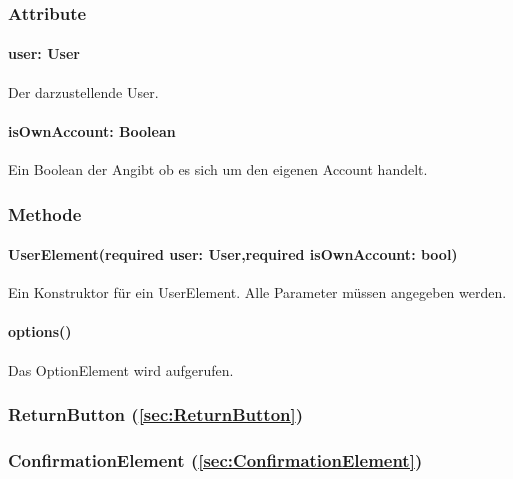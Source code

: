\documentclass[parskip=full]{scrartcl}
\begin{document}
        \subsubsection*{Attribute}

            \paragraph*{user: User} Der darzustellende User.
            \paragraph*{isOwnAccount: Boolean} Ein Boolean der Angibt ob es sich um den eigenen Account handelt.

        \subsubsection*{Methode}
            \paragraph*{UserElement(required user: User,required isOwnAccount: bool)} Ein Konstruktor für ein UserElement. Alle Parameter müssen angegeben werden.
            \paragraph*{options()} Das OptionElement wird aufgerufen.

        \subsubsection*{ReturnButton (\ref{sec:ReturnButton})}

        \subsubsection*{ConfirmationElement (\ref{sec:ConfirmationElement})}
\end{document}
